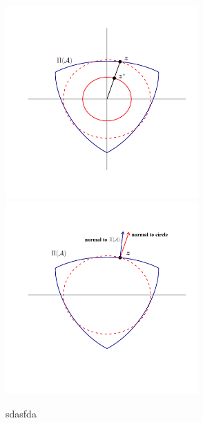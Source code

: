 \documentclass[ba]{imsart}
\newcommand{\bz}{\mbox{\boldmath $z$}}
\begin{document}
\begin{figure}[t]
\centering
{\includegraphics[width=2.9in]{minSSZSpace3.pdf}}
{\includegraphics[width=2.9in]{minSSZSpace5.pdf}}
\label{fig:stretchDeform}
\caption{sdasfda}
\end{figure}

\end{document}
